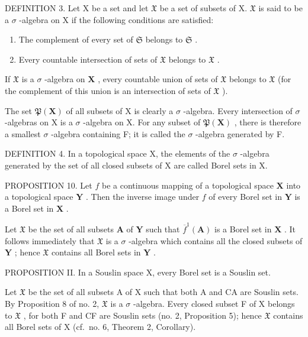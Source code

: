 DEFINITION 3. Let X be a set and let \(\mathfrak{X}\) be a set of subsets of X. \(\mathfrak{X}\) is said to be a \(\sigma\) -algebra on X if the following conditions are satisfied:

\begin{enumerate}
\def\labelenumi{\alph{enumi})}
\item
  The complement of every set of \(\mathfrak{S}\) belongs to \(\mathfrak{S}\) .
\item
  Every countable intersection of sets of \(\mathfrak{X}\) belongs to \(\mathfrak{X}\) .
\end{enumerate}

If \(\mathfrak{X}\) is a \(\sigma\) -algebra on \(\mathbf{X}\) , every countable union of sets of \(\mathfrak{X}\) belongs to \(\mathfrak{X}\) (for the complement of this union is an intersection of sets of \(\mathfrak{X}\) ).

The set \(\mathfrak{P}(\mathbf{X})\) of all subsets of X is clearly a \(\sigma\) -algebra. Every intersection of \(\sigma\) -algebras on X is a \(\sigma\) -algebra on X. For any subset of \(\mathfrak{P}(\mathbf{X})\) , there is therefore a smallest \(\sigma\) -algebra containing F; it is called the \(\sigma\) -algebra generated by F.

DEFINITION 4. In a topological space X, the elements of the \(\sigma\) -algebra generated by the set of all closed subsets of X are called Borel sets in X.

PROPOSITION 10. Let \(f\) be a continuous mapping of a topological space \(\mathbf{X}\) into a topological space \(\mathbf{Y}\) . Then the inverse image under \(f\) of every Borel set in \(\mathbf{Y}\) is a Borel set in \(\mathbf{X}\) .

Let \(\mathfrak{X}\) be the set of all subsets \(\mathbf{A}\) of \(\mathbf{Y}\) such that \(\overline{f}^1 (\mathbf{A})\) is a Borel set in \(\mathbf{X}\) . It follows immediately that \(\mathfrak{X}\) is a \(\sigma\) -algebra which contains all the closed subsets of \(\mathbf{Y}\) ; hence \(\mathfrak{X}\) contains all Borel sets in \(\mathbf{Y}\) .

PROPOSITION II. In a Souslin space X, every Borel set is a Souslin set.

Let \(\mathfrak{X}\) be the set of all subsets A of X such that both A and CA are Souslin sets. By Proposition 8 of no. 2, \(\mathfrak{X}\) is a \(\sigma\) -algebra. Every closed subset F of X belongs to \(\mathfrak{X}\) , for both F and CF are Souslin sets (no. 2, Proposition 5); hence \(\mathfrak{X}\) contains all Borel sets of X (cf.~no. 6, Theorem 2, Corollary).

